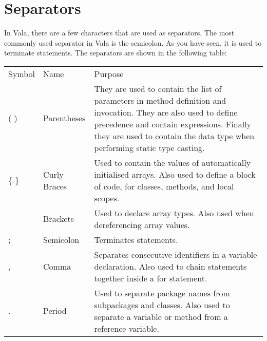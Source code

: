 \section{Separators}
In Vala, there are a few characters that are used as separators. The most commonly used separator in Vala is the semicolon. As you have seen, it is used to terminate
statements. The separators are shown in the following table:

\begin{center}
  \begin{tabular*}{0.9\textwidth}{@{\extracolsep{\fill}} l l p{4in} }
    Symbol & Name & Purpose \\
    ( ) & Parentheses & They are used to contain the list of parameters in method definition and invocation. They are also used to define precedence  and contain expressions. Finally they are used to contain the data type when performing static type casting. \\
    \{ \} & Curly Braces & Used to contain the values of automatically initialised arrays. Also used to define a block of code, for classes, methods, and local scopes. \\ \relax
    [ ] & Brackets & Used to declare array types. Also used when dereferencing array values. \\
    ; & Semicolon & Terminates statements. \\
    , & Comma & Separates consecutive identifiers in a variable declaration. Also used to chain statements together inside a for statement. \\
    . & Period & Used to separate package names from subpackages and classes. Also used to separate a variable or method from a reference variable.
  \end{tabular*}
\end{center}
